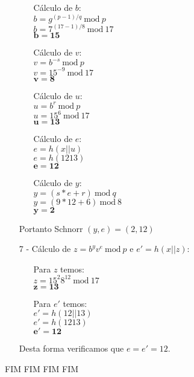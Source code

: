 \documentclass[12pt]{article}
\newcommand{\modd}{\ \text{mod}\ }
\begin{document}
\begin{itemize}
\begin{itemize}
					\item[]
						Cálculo de $b$:\\
						$b = g^{(p-1)/q} \modd p$\\
						$b = 7^{(17-1)/8} \modd 17$\\
						$\mathbf{b = 15}$
					\item[]
						Cálculo de $v$:\\
						$v = b^{-s} \modd p$\\
						$v = 15^{-9} \modd 17$\\
						$\mathbf{v = 8}$
					\item[]
						Cálculo de $u$:\\
						$u = b^r \modd p$\\
						$u = 15^6 \modd 17$\\
						$\mathbf{u = 13}$
					\item[]
						Cálculo de $e$:\\
						$e = h(x||u)$\\
						$e = h(1213)$\\
						$\mathbf{e = 12}$	
					\item[]
						Cálculo de $y$:\\
						$y = (s*e + r) \modd q$\\
						$y = (9*12 + 6) \modd 8$\\
						$\mathbf{y = 2}$						
				\end{itemize}	
			Portanto Schnorr $(y, e) = (2, 12)$	 
			\item[7 -]
				Cálculo de $z = b^y v^e  \modd p$ e $e' = h(x||z)$:\\
				\begin{itemize}
					\item[]
						Para $z$ temos:\\
						$z = 15^2 8^{12}  \modd 17$\\
						$\mathbf{z = 13}$
					\item[]
						Para $e'$ temos:\\
						$e' = h(12||13)$\\
						$e' = h(1213)$\\
						$\mathbf{e' = 12}$	
				\end{itemize}		
				Desta forma verificamos que $e = e' = 12$.									
		\end{itemize}
		\begin{center}
			FIM FIM FIM FIM
		\end{center}
\end{document}
